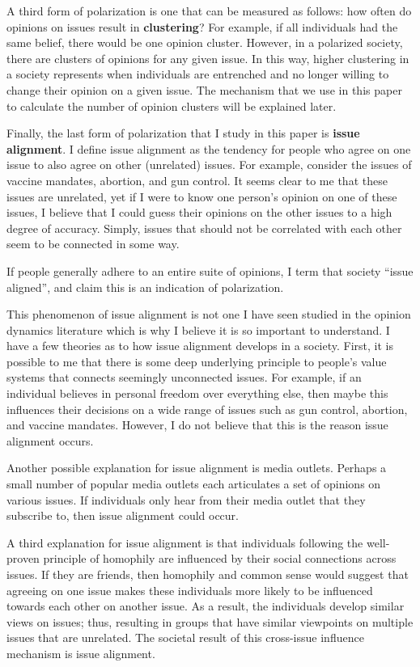 A third form of polarization is one that can be measured as follows:
how often do opinions on issues result in \textbf{clustering}? For
example, if all individuals had the same belief, there would be one opinion
cluster. However, in a polarized society, there are clusters of opinions for any given issue. In this way, higher clustering in a society represents when individuals are entrenched and no longer willing to change their opinion on a given issue. The mechanism that we use in this paper to calculate the number of opinion clusters will be explained later.

Finally, the last form of polarization that I study in this paper is \textbf{issue alignment}. I define issue alignment as the tendency for people who agree on one issue to also agree on other (unrelated) issues. For example, consider the issues of vaccine mandates, abortion, and gun control. It seems clear to me that these issues are unrelated, yet if I were to know one person's opinion on one of these issues, I believe that I could guess their opinions on the other issues to a high degree of accuracy. Simply, issues that should not be correlated with each other seem to be connected in some way. 

If people generally adhere to an entire suite of opinions, I term that society ``issue aligned'', and claim this is an indication of polarization. 

This phenomenon of issue alignment is not one I have seen studied in the opinion dynamics literature which is why I believe it is so important to understand. I have a few theories as to how issue alignment develops in a society. First, it is possible to me that there is some deep underlying principle to people's value systems that connects seemingly unconnected issues. For example, if an individual believes in personal freedom over everything else, then maybe this influences their decisions on a wide range of issues such as gun control, abortion, and vaccine mandates. However, I do not believe that this is the reason issue alignment occurs. 

Another possible explanation for issue alignment is media outlets. Perhaps a small number of popular media outlets each articulates a set of opinions on various issues. If individuals only hear from their media outlet that they subscribe to, then issue alignment could occur.

A third explanation for issue alignment is that individuals following the well-proven principle of homophily are influenced by their social connections across issues. If they are friends, then homophily and common sense would suggest that agreeing on one issue makes these individuals more likely to be influenced towards each other on another issue. As a result, the individuals develop similar views on issues; thus, resulting in groups that have similar viewpoints on multiple issues that are unrelated. The societal result of this cross-issue influence mechanism is issue alignment.   
